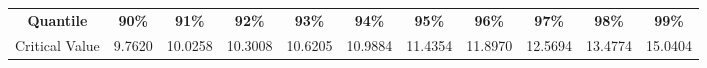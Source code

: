 
		\begin{tabular}{ccccccccccc}
		\hline	
		\hline		
		{\bf{Quantile}} & {\bf{90\%}} & {\bf{91\%}} & {\bf{92\%}} & {\bf{93\%}} & {\bf{94\%}} & {\bf{95\%}} & {\bf{96\%}} & {\bf{97\%}} & {\bf{98\%}} & {\bf{99\%}}  \\

		Critical Value &  9.7620 & 10.0258 & 10.3008  &  10.6205 & 10.9884  & 11.4354 & 11.8970  & 12.5694 & 13.4774 & 15.0404   \\
		
		\hline
		\end{tabular}
			